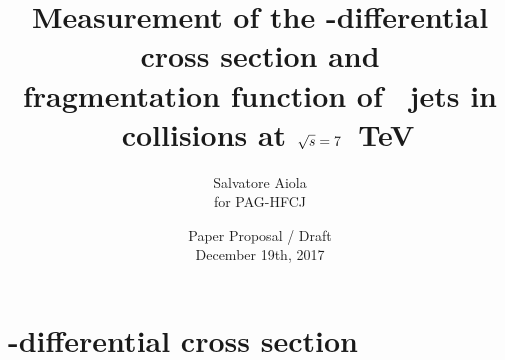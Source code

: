 \documentclass[xcolor={usenames,dvipsnames}, aspectratio=169]{beamer}
\title[D-Tagged Jets in \pp] %
{Measurement of the \pt-differential cross section and \\ fragmentation function of \Dzero\ jets in \pp\ collisions at $\sqrt{s}=7$~TeV}
\author[Salvatore Aiola]%
{Salvatore Aiola \\
for PAG-HFCJ}
\institute[Yale University] %
{Yale University}
\date[Dec. 19th, 2017] %
{Paper Proposal / Draft \\
December 19th, 2017}
\begin{document}
\begin{frame}
  \titlepage
\end{frame}








\section{\pt-differential cross section}
\end{document}
